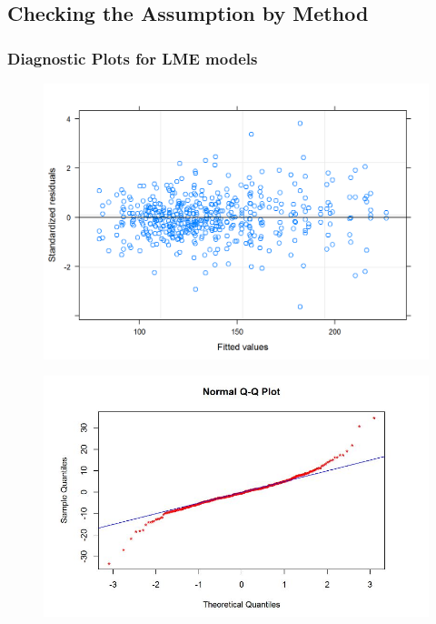 \documentclass[12pt, a4paper]{report}
\theoremstyle{plain}
\theoremstyle{definition}
\theoremstyle{remark}
\begin{document}
	


	\subsection{Checking the Assumption by Method}
	
	
	

	\subsubsection{Diagnostic Plots for LME models}
	
	
	
	
	
	\begin{figure}[h!]
		\centering
		\includegraphics[width=0.9\linewidth]{images/ResidPlot1}
		\caption{}
		\label{fig:ResidPlot1}
	\end{figure}
	
	
	
	\begin{figure}[h!]
		\centering
		\includegraphics[width=0.7\linewidth]{images/Resid-newplot}
		\caption{}
		\label{fig:Resid-newplot}
	\end{figure}
	
\end{document}
